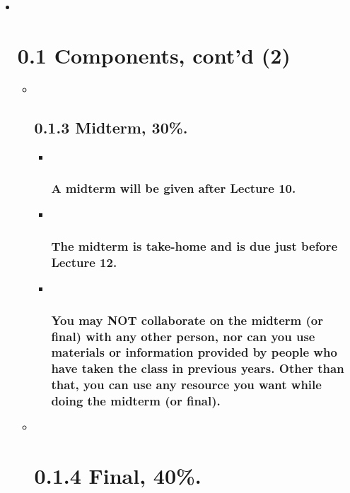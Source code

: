 \documentclass[11pt]{article}
\begin{document}
    \begin{itemize}
\item ~
  \section{\texorpdfstring{{0.1 Components, cont'd
  (2)}}{0.1 Components, cont'd (2)}}\label{components-contd-2}

  \begin{itemize}
  \item ~
    \subsection{\texorpdfstring{{0.1.3 Midterm,
    30\%.}}{0.1.3 Midterm, 30\%.}}\label{midterm-30.}

    \begin{itemize}
    \item ~
      \subsubsection{A midterm will be given after Lecture
      10.}\label{a-midterm-will-be-given-after-lecture-10.}
    \item ~
      \subsubsection{The midterm is take-home and is due just before
      Lecture
      12.}\label{the-midterm-is-take-home-and-is-due-just-before-lecture-12.}
    \item ~
      \subsubsection{You may NOT collaborate on the midterm (or final)
      with any other person, nor can you use materials or information
      provided by people who have taken the class in previous years.
      Other than that, you can use any resource you want while doing the
      midterm (or
      final).}\label{you-may-not-collaborate-on-the-midterm-or-final-with-any-other-person-nor-can-you-use-materials-or-information-provided-by-people-who-have-taken-the-class-in-previous-years.-other-than-that-you-can-use-any-resource-you-want-while-doing-the-midterm-or-final.}
    \end{itemize}
  \item ~
    \section{\texorpdfstring{{0.1.4 Final,
    40\%.}}{0.1.4 Final, 40\%.}}\label{final-40.}


\end{itemize}
\end{itemize}
\end{document}
